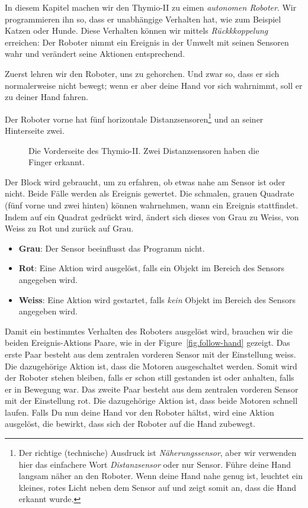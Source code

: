 \label{ch.pet}

In diesem Kapitel machen wir den Thymio-II zu eimen \emph{autonomen Roboter}.
Wir programmieren ihn so, dass er unabhängige Verhalten hat, wie zum Beispiel
Katzen oder Hunde. Diese Verhalten können wir mittels \textit{Rückkkoppelung}
erreichen: Der Roboter nimmt ein Ereignis in der Umwelt mit seinen Sensoren
wahr und verändert seine Aktionen entsprechend.


Zuerst lehren wir den Roboter, uns zu gehorchen. 
Und zwar so, dass er sich normalerweise nicht bewegt; 
wenn er aber deine Hand vor sich wahrnimmt, soll er
zu deiner Hand fahren.

Der Roboter vorne hat fünf horizontale Distanzsensoren\footnote{Der richtige
 (technische) Ausdruck ist \emph{Näherungssensor}, aber wir verwenden hier
 das einfachere Wort \emph{Distanzsensor} oder nur Sensor. Führe deine Hand langsam näher an
 den Roboter. Wenn deine Hand nahe genug ist, leuchtet ein kleines, rotes
Licht neben dem Sensor auf und zeigt somit an, dass die Hand erkannt wurde.}
und an seiner Hinterseite zwei. 

\begin{figure}
\begin{center}
\caption{Die Vorderseite des Thymio-II. Zwei Distanzsensoren haben die Finger
erkannt.}
\label{fig.detect}
\end{center}
\end{figure}

Der Block  wird gebraucht, 
um zu erfahren, ob etwas nahe am Sensor ist oder nicht. 
Beide Fälle werden als Ereignis gewertet. 
Die schmalen, grauen Quadrate (fünf vorne und zwei hinten) können wahrnehmen,
 wann ein Ereignis stattfindet. 
 Indem auf ein Quadrat gedrückt wird, 
 ändert sich dieses von Grau zu Weiss, 
 von Weiss zu Rot und zurück auf Grau.

\begin{itemize}
\item \textbf{Grau}: Der Sensor beeinflusst das Programm nicht.
\item \textbf{Rot}: Eine Aktion wird ausgelöst, falls ein Objekt im Bereich des Sensors angegeben wird.
\item \textbf{Weiss}: Eine Aktion wird gestartet, falls \emph{kein} Objekt im Bereich des Sensors angegeben wird.
\end{itemize}

Damit  ein bestimmtes Verhalten des Roboters ausgelöst wird, 
brauchen wir die beiden Ereignis-Aktions Paare, 
wie in der Figure~\ref{fig.follow-hand} gezeigt. 
Das erste Paar besteht aus dem zentralen vorderen Sensor mit der Einstellung weiss. 
Die dazugehörige Aktion ist, dass die Motoren ausgeschaltet werden. 
Somit wird der Roboter stehen bleiben, falls er schon still gestanden ist oder anhalten, 
falls er in Bewegung war. 
Das zweite Paar besteht aus dem zentralen vorderen Sensor mit der Einstellung rot. 
Die dazugehörige Aktion ist, dass beide Motoren schnell laufen. 
Falls Du nun deine Hand vor den Roboter hältst, wird eine Aktion ausgelöst, die bewirkt, 
dass sich der Roboter auf die Hand zubewegt.

